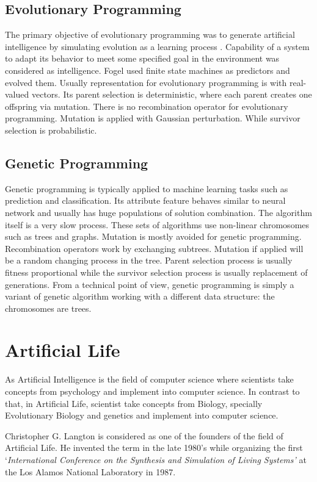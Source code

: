 \subsection{Evolutionary Programming}
The primary objective of evolutionary programming was to generate artificial intelligence by simulating evolution as a learning process \cite{fogel1966}. Capability of a system to adapt its behavior to meet some specified goal in the environment was considered as intelligence. Fogel used finite state machines as predictors and evolved them. Usually representation for evolutionary programming is with real-valued vectors. Its parent selection is deterministic, where each parent creates one offspring via mutation. There is no recombination operator for evolutionary programming. Mutation is applied with Gaussian perturbation. While survivor selection is probabilistic. 

\subsection{Genetic Programming}
Genetic programming is typically applied to machine learning tasks such as prediction and classification. Its attribute feature behaves similar to neural network and usually has huge populations of solution combination. The algorithm itself is a very slow process. These sets of algorithms use non-linear chromosomes such as trees and graphs. Mutation is mostly avoided for genetic programming. Recombination operators work by exchanging subtrees. Mutation if applied will be a random changing process in the tree. Parent selection process is usually fitness proportional while the survivor selection process is usually replacement of generations. From a technical point of view, genetic programming is simply a variant of genetic algorithm working with a different data structure: the chromosomes are trees. 

\section{Artificial Life}
As Artificial Intelligence is the field of computer science where scientists take concepts from psychology and implement into computer science. In contrast to that, in Artificial Life, scientist take concepts from Biology, specially Evolutionary Biology and genetics and implement into computer science. 

Christopher G. Langton is considered as one of the founders of the field of Artificial Life. He invented the term in the late 1980's while organizing the first `\textsl{International Conference on the Synthesis and Simulation of Living Systems'} at the Los Alamos National Laboratory in 1987.

